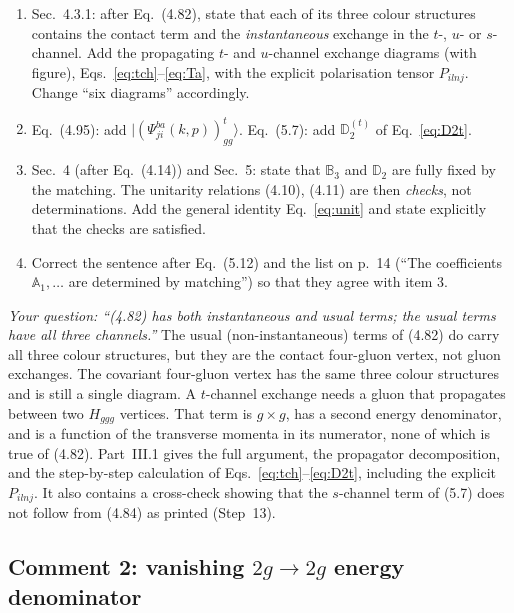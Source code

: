 \documentclass[11pt,a4paper]{article}
\newcommand{\Hggg}{H_{ggg}}
\newcommand{\eq}[1]{Eq.~(#1)}
\begin{document}
\begin{changes}
\begin{enumerate}[leftmargin=16pt,itemsep=2pt]
\item Sec.~4.3.1: after Eq.~(4.82), state that each of its three colour structures contains the contact term and the \emph{instantaneous} exchange in the $t$-, $u$- or $s$-channel. Add the propagating $t$- and $u$-channel exchange diagrams (with figure), Eqs.~\eqref{eq:tch}--\eqref{eq:Ta}, with the explicit polarisation tensor $P_{ilnj}$. Change ``six diagrams'' accordingly.
\item \eq{4.95}: add $|(\Psi^{ba}_{ji}(k,p))^{t}_{gg}\rangle$. \eq{5.7}: add $\mathbb D_2^{(t)}$ of Eq.~\eqref{eq:D2t}.
\item Sec.~4 (after \eq{4.14}) and Sec.~5: state that $\mathbb B_3$ and $\mathbb D_2$ are fully fixed by the matching. The unitarity relations (4.10), (4.11) are then \emph{checks}, not determinations. Add the general identity Eq.~\eqref{eq:unit} and state explicitly that the checks are satisfied.
\item Correct the sentence after \eq{5.12} and the list on p.~14 (``The coefficients $\mathbb A_1,\dots$ are determined by matching'') so that they agree with item 3.
\end{enumerate}
\end{changes}

\begin{authornote}
\emph{Your question: ``(4.82) has both instantaneous and usual terms; the usual terms have all three channels.''} The usual (non-instantaneous) terms of (4.82) do carry all three colour structures, but they are the contact four-gluon vertex, not gluon exchanges. The covariant four-gluon vertex has the same three colour structures and is still a single diagram. A $t$-channel exchange needs a gluon that propagates between two $\Hggg$ vertices. That term is $g\times g$, has a second energy denominator, and is a function of the transverse momenta in its numerator, none of which is true of (4.82). Part~III.1 gives the full argument, the propagator decomposition, and the step-by-step calculation of Eqs.~\eqref{eq:tch}--\eqref{eq:D2t}, including the explicit $P_{ilnj}$. It also contains a cross-check showing that the $s$-channel term of (5.7) does not follow from (4.84) as printed (Step~13).
\end{authornote}

\subsection*{Comment 2: vanishing $2g\to2g$ energy denominator}
\end{document}
